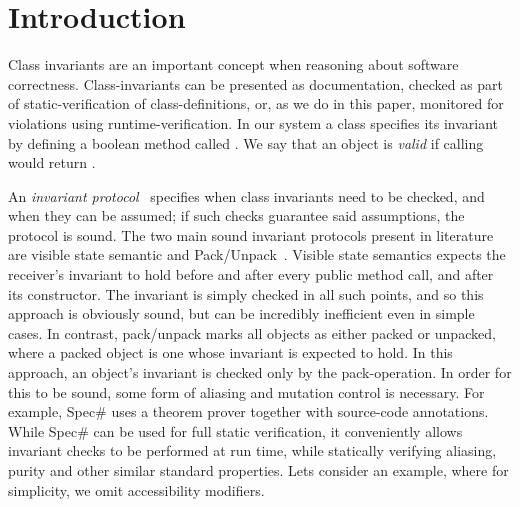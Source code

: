 \section{Introduction}

Class invariants are an important concept when reasoning about software correctness.
Class-invariants can be presented as documentation, checked as part of static-verification of class-definitions, or, as we do in this paper, monitored for violations using runtime-verification.
In our system a class specifies its invariant by defining a boolean method called \Q@invariant@. We say that an object is \emph{valid} if calling \Q@invariant@ would return \Q@true@.

An \emph{invariant protocol}~\cite{?} specifies when class invariants need to be checked, and when they can be assumed; if such checks guarantee said assumptions, the protocol is sound.
The two main sound invariant protocols present in literature are visible state semantic \cite{??} and Pack/Unpack~\cite{?}. Visible state semantics expects the receiver's invariant to hold before and after every public method call, and after its constructor. The invariant is simply checked in all such points, and so this approach is obviously sound, but can be incredibly inefficient even in simple cases.
In contrast, pack/unpack marks all objects as either packed or unpacked, where a packed object is one whose invariant is expected to hold.
In this approach, an object's invariant is checked only by the pack-operation.
In order for this to be sound, some form of aliasing and mutation control is necessary. For example, Spec\# uses a theorem prover together with source-code annotations.
While Spec\# can be used for full static verification, it conveniently allows invariant checks to be performed
at run time, while statically verifying aliasing, purity and other similar standard properties.
Lets consider an example, where for simplicity, we omit accessibility modifiers.
\newpage
